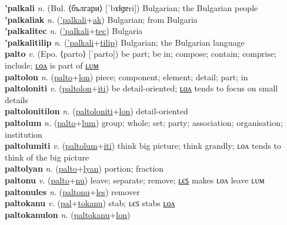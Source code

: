 \textbf{'palkali} \textit{n.} (Bul. ⟨българи⟩ [ˈbɤɫɡɐri])
Bulgarian; the Bulgarian people \label{'palkali} \\
\textbf{'palkaliak} \textit{n.} (\hyperref['palkali]{'palkali}+\hyperref[ak]{ak})
Bulgarian; from Bulgaria \label{'palkaliak} \\
\textbf{'palkalitec} \textit{n.} (\hyperref['palkali]{'palkali}+\hyperref[tec]{tec})
Bulgaria \label{'palkalitec} \\
\textbf{'palkalitilip} \textit{n.} (\hyperref['palkali]{'palkali}+\hyperref[tilip]{tilip})
Bulgarian; the Bulgarian language \label{'palkalitilip} \\
\textbf{palto} \textit{v.} (Epo. ⟨parto⟩ [ˈparto])
be part; be in; compose; contain; comprise; include; \hyperref[paltolon]{ʟᴏᴧ} is part of \hyperref[paltolum]{ʟᴜᴍ} \label{palto} \\
\textbf{paltolon} \textit{n.} (\hyperref[palto]{palto}+\hyperref[lon]{lon})
piece; component; element; detail; part; in \label{paltolon} \\
\textbf{paltoloniti} \textit{v.} (\hyperref[paltolon]{paltolon}+\hyperref[iti]{iti})
be detail-oriented; \hyperref[paltolonitilon]{ʟᴏᴧ} tends to focus on small details \label{paltoloniti} \\
\textbf{paltolonitilon} \textit{n.} (\hyperref[paltoloniti]{paltoloniti}+\hyperref[lon]{lon})
detail-oriented \label{paltolonitilon} \\
\textbf{paltolum} \textit{n.} (\hyperref[palto]{palto}+\hyperref[lum]{lum})
group; whole; set; party; association; organisation; institution \label{paltolum} \\
\textbf{paltolumiti} \textit{v.} (\hyperref[paltolum]{paltolum}+\hyperref[iti]{iti})
think big picture; think grandly; ʟᴏᴧ tends to think of the big picture \label{paltolumiti} \\
\textbf{paltolyan} \textit{n.} (\hyperref[palto]{palto}+\hyperref[lyan]{lyan})
portion; fraction \label{paltolyan} \\
\textbf{paltonu} \textit{v.} (\hyperref[palto]{palto}+\hyperref[nu]{nu})
leave; separate; remove; \hyperref[paltonules]{ʟєꜱ} makes ʟᴏᴧ leave ʟᴜᴍ \label{paltonu} \\
\textbf{paltonules} \textit{n.} (\hyperref[paltonu]{paltonu}+\hyperref[les]{les})
remover \label{paltonules} \\
\textbf{paltokanu} \textit{v.} (\hyperref[pal]{pal}+\hyperref[tokanu]{tokanu})
stab; ʟєꜱ stabs \hyperref[paltokanulon]{ʟᴏᴧ} \label{paltokanu} \\
\textbf{paltokanulon} \textit{n.} (\hyperref[paltokanu]{paltokanu}+\hyperref[lon]{lon})
